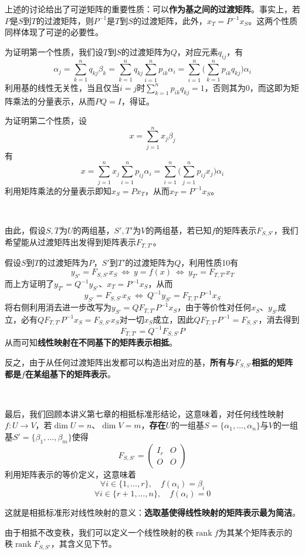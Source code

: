 \documentclass[a4paper,UTF8,fontset=windows]{ctexart}
\DeclareMathOperator{\rank}{rank}
\newcommand*{\note}{\noindent *}
\begin{document}
上述的讨论给出了可逆矩阵的重要性质：可以\textbf{作为基之间的过渡矩阵}。事实上，若$P$是$S$到$T$的过渡矩阵，则$P^{-1}$是$T$到$S$的过渡矩阵，此外，$x_T=P^{-1}x_S$。这两个性质同样体现了可逆的必要性。

为证明第一个性质，我们设$T$到$S$的过渡矩阵为$Q$，对应元素$q_{ij}$，有
$$\alpha_j=\sum_{k=1}^nq_{kj}\beta_k=\sum_{k=1}^nq_{kj}\sum_{i=1}^np_{ik}\alpha_i=\sum_{i=1}^n\bigg(\sum_{k=1}^np_{ik}q_{kj}\bigg)\alpha_i$$
利用基的线性无关性，当且仅当$i=j$时$\sum_{k=1}^np_{ik}q_{kj}=1$，否则其为0，而这即为矩阵乘法的分量表示，从而$PQ=I$，得证。

为证明第二个性质，设
$$x=\sum_{j=1}^nx_j\beta_j$$
有
$$x=\sum_{j=1}^nx_j\sum_{i=1}^np_{ij}\alpha_i=\sum_{i=1}^n\bigg(\sum_{j=1}^np_{ij}x_j\bigg)\alpha_i$$
利用矩阵乘法的分量表示即知$x_S=Px_T$，从而$x_T=P^{-1}x_S$。

\

由此，假设$S,T$为$U$的两组基，$S',T'$为$V$的两组基，若已知$f$的矩阵表示$F_{S,S'}$，我们希望能从过渡矩阵出发得到矩阵表示$F_{T,T'}$。

假设$S$到$T$的过渡矩阵为$P$，$S'$到$T'$的过渡矩阵为$Q$，利用性质10有
$$y_{S'}=F_{S,S'}x_S\ \Longleftrightarrow\ y=f(x)\ \Longleftrightarrow\ y_{T'}=F_{T,T'}x_T$$
而上方证明了$y_{T'}=Q^{-1}y_{S'}$、$x_T=P^{-1}x_S$，从而
$$y_{S'}=F_{S,S'}x_S\ \Longleftrightarrow\ Q^{-1}y_{S'}=F_{T,T'}P^{-1}x_S$$
将右侧利用消去进一步改写为$y_{S'}=QF_{T,T'}P^{-1}x_S$，由于等价性对任何$x_S$、$y_{S'}$成立，必有$QF_{T,T'}P^{-1}x_S=F_{S,S'}x_S$对一切$x_S$成立，因此$QF_{T,T'}P^{-1}=F_{S,S'}$，消去得到
$$F_{T,T'}=Q^{-1}F_{S,S'}P$$
从而可知\textbf{线性映射在不同基下的矩阵表示相抵}。

反之，由于从任何过渡矩阵出发都可以构造出对应的基，\textbf{所有与$F_{S,S'}$相抵的矩阵都是$f$在某组基下的矩阵表示}。

\

最后，我们回顾本讲义第七章的相抵标准形结论，这意味着，对任何线性映射$f:U\to V$，若$\dim U=n$、$\dim V=m$，\textbf{存在}$U$的一组基$S=\{\alpha_1,\dots,\alpha_n\}$与$V$的一组基$S'=\{\beta_1,\dots,\beta_m\}$使得
$$F_{S,S'}=\begin{pmatrix}I_r&O\\O&O\end{pmatrix}$$
利用矩阵表示的等价定义，这意味着
$$\forall i\in\{1,\dots,r\},\quad f(\alpha_i)=\beta_i$$
$$\forall i\in\{r+1,\dots,n\},\quad f(\alpha_i)=0$$

这就是相抵标准形对线性映射的意义：\textbf{选取基使得线性映射的矩阵表示最为简洁}。

\note 由于相抵不改变秩，我们可以定义一个线性映射的秩$\rank f$为其某个矩阵表示的秩$\rank F_{S,S'}$，其含义见下节。
\end{document}
